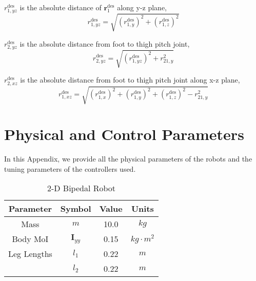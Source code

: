 $r^\text{des}_{1,yz}$ is the absolute distance of $\bm r^\text{des}_{1}$ along y-z plane,
\begin{equation}
    r^\text{des}_{1,yz} = \sqrt{(r^\text{des}_{1,y})^2+(r^\text{des}_{1,z})^2}
\end{equation}

$r^\text{des}_{2,yz}$ is the absolute distance from foot to thigh pitch joint,  
\begin{equation}
    r^\text{des}_{2,yz} = \sqrt{(r^\text{des}_{1,yz})^2+r_{21,y}^2}
\end{equation}

$r^\text{des}_{2,xz}$ is the absolute distance from foot to thigh pitch joint along x-z plane,
\begin{equation}
    r^\text{des}_{1,xz} = \sqrt{(r^\text{des}_{1,x})^2+(r^\text{des}_{1,y})^2+(r^\text{des}_{1,z})^2 - r_{21,y}^2}
\end{equation}
\vspace{0.2cm}

\section {Physical and Control Parameters}
In this Appendix, we provide all the physical parameters of the robots and the tuning parameters of the controllers used. 

\begin{table}[H]
	\vspace{-0.1cm}
	\centering
        \caption{2-D Bipedal Robot}
	\begin{tabular}{cccc}
		\hline
		Parameter & Symbol & Value & Units\\
		\hline
		Mass & $m$    & 10.0 & $\unit{kg}$  \\
		  Body MoI  & $\bm I_{yy}$  & 0.15 & $\unit{kg}\cdot \unit{m}^2$ \\
		Leg Lengths & $l_1$    & 0.22 & 
          $\unit{m}$  \\
          & $l_2$    & 0.22 & $\unit{m}$  \\
		\hline 
	\end{tabular}
	\vspace{0.2cm}
\end{table}	
\clearpage

